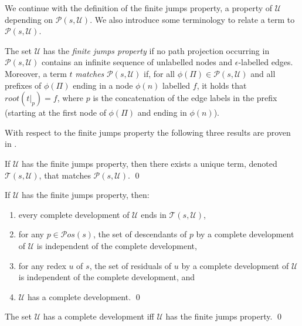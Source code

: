\documentclass{LMCS}
\theoremstyle{definition}
\newcommand{\pos}[1]{\mathcal{P}os(#1)}
\newcommand{\rs}[1]{root(#1)}
\newcommand{\apath}{\Pi}
\begin{document}
We continue with the definition of the finite jumps property, a property of $\mathcal{U}$ depending on $\mathcal{P}(s, \mathcal{U})$. We also introduce some terminology to relate a term to $\mathcal{P}(s, \mathcal{U})$.

\begin{defi}
The set $\mathcal{U}$ has the \emph{finite jumps property} if no path projection occurring in $\mathcal{P}(s, \mathcal{U})$ contains an infinite sequence of unlabelled nodes and $\epsilon$-labelled edges. Moreover, a term $t$ \emph{matches} $\mathcal{P}(s, \mathcal{U})$ if, for all $\phi(\apath) \in \mathcal{P}(s, \mathcal{U})$ and all prefixes of $\phi(\apath)$ ending in a node $\phi(n)$ labelled $f$, it holds that $\rs{t|_p} = f$, where $p$ is the concatenation of the edge labels in the prefix (starting at the first node of $\phi(\apath)$ and ending in $\phi(n)$).
\end{defi}

With respect to the finite jumps property the following three results are proven in \cite{JJ05a}.

\begin{prop}
\label{uniqueterm}
If $\mathcal{U}$ has the finite jumps property, then there exists a unique term, denoted $\mathcal{T}(s, \mathcal{U})$, that matches $\mathcal{P}(s, \mathcal{U})$. \qed
\end{prop}

\begin{thm}
\label{fjdt}
If $\mathcal{U}$ has the finite jumps property, then:
\begin{enumerate}[\em(1)]
\item
every complete development of $\mathcal{U}$ ends in $\mathcal{T}(s, \mathcal{U})$,
\item
for any $p \in \pos{s}$, the set of descendants of $p$ by a complete development of $\mathcal{U}$ is independent of the complete development,
\item
for any redex $u$ of $s$, the set of residuals of $u$ by a complete development of $\mathcal{U}$ is independent of the complete development, and
\item
$\mathcal{U}$ has a complete development. \qed
\end{enumerate}
\end{thm}

\begin{lem}
\label{compimplfinite}
The set $\mathcal{U}$ has a complete development if{f} $\mathcal{U}$ has the finite jumps property. \qed
\end{lem}
\end{document}

